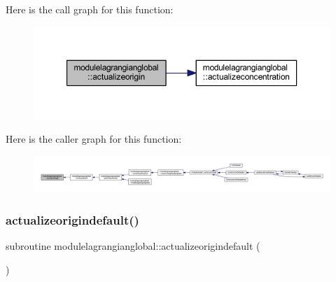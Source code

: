 Here is the call graph for this function\+:\nopagebreak
\begin{figure}[H]
\begin{center}
\leavevmode
\includegraphics[width=350pt]{namespacemodulelagrangianglobal_a2922324362ebb3dd949bc869b16e90b9_cgraph}
\end{center}
\end{figure}
Here is the caller graph for this function\+:\nopagebreak
\begin{figure}[H]
\begin{center}
\leavevmode
\includegraphics[width=350pt]{namespacemodulelagrangianglobal_a2922324362ebb3dd949bc869b16e90b9_icgraph}
\end{center}
\end{figure}
\mbox{\label{namespacemodulelagrangianglobal_acd7b83696893d6d898a278da13db5768}} 
\subsubsection{\texorpdfstring{actualizeorigindefault()}{actualizeorigindefault()}}
{\footnotesize\ttfamily subroutine modulelagrangianglobal\+::actualizeorigindefault (\begin{DoxyParamCaption}{ }\end{DoxyParamCaption})\hspace{0.3cm}{\ttfamily [private]}}

